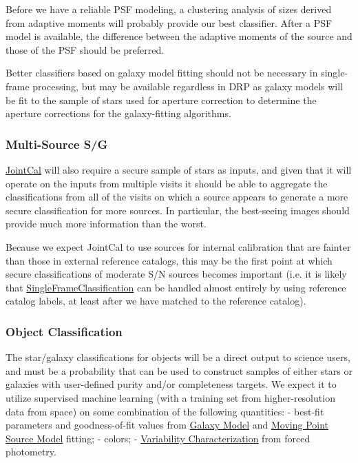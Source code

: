Before we have a reliable PSF modeling, a clustering analysis of sizes derived from adaptive moments will probably provide our best classifier.  After a PSF model is available, the difference between the adaptive moments of the source and those of the PSF should be preferred.

Better classifiers based on galaxy model fitting should not be necessary in single-frame processing, but may be available regardless in DRP as galaxy models will be fit to the sample of stars used for aperture correction to determine the aperture corrections for the galaxy-fitting algorithms.

\subsubsection{Multi-Source S/G}
\label{sec:acJointCalClassification}

\hyperref[sec:drpStandardJointCal]{JointCal} will also require a secure sample of stars as inputs, and given that it will operate on the inputs from multiple visits it should be able to aggregate the classifications from all of the visits on which a source appears to generate a more secure classification for more sources.  In particular, the best-seeing images should provide much more information than the worst.

Because we expect JointCal to use sources for internal calibration that are fainter than those in external reference catalogs, this may be the first point at which secure classifications of moderate S/N sources becomes important (i.e. it is likely that \hyperref[sec:acSingleFrameClassification]{SingleFrameClassification} can be handled almost entirely by using reference catalog labels, at least after we have matched to the reference catalog).

\subsubsection{Object Classification}
\label{sec:acObjectClassification}

The star/galaxy classifications for objects will be a direct output to science users, and must be a probability that can be used to construct samples of either stars or galaxies with user-defined purity and/or completeness targets.  We expect it to utilize supervised machine learning (with a training set from higher-resolution data from space) on some combination of the following quantities:
 - best-fit parameters and goodness-of-fit values from \hyperref[sec:acGalaxyModels]{Galaxy Model} and \hyperref[sec:acMovingPointSourceModels]{Moving Point Source Model} fitting;
 - colors;
 - \hyperref[sec:acVariabilityCharacterization]{Variability Characterization} from forced photometry.

